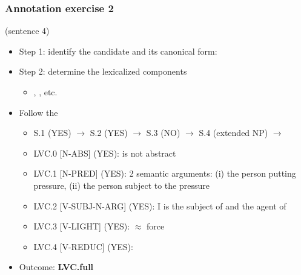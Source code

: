 \documentclass[xcolor=dvipsnames]{beamer}
\begin{document}
\begin{frame} 
\frametitle{Annotation exercise 2}

 (sentence 4)
\pause
\begin{scriptsize}
\begin{block}{}
\begin{itemize}
\item Step 1: identify the candidate and its canonical form: 
\item Step 2: determine the lexicalized components
   \begin{itemize}
   \item {}, , etc.
   \end{itemize}
\item Follow the \href{http://parsemefr.lif.univ-mrs.fr/parseme-st-guidelines/1.3/?page=040\_Annotation\_process\_-\_decision\_tree}{}
   \begin{itemize}
   \item S.1 (YES) $\rightarrow$ S.2 (YES) $\rightarrow$ S.3 (NO) $\rightarrow$ S.4 (extended NP) $\rightarrow$
   \item LVC.0 [N-ABS] (YES):  is not abstract
   \item LVC.1 [N-PRED] (YES): 2 semantic arguments: (i) the person putting pressure, (ii) the person subject to the pressure
   \item LVC.2 [V-SUBJ-N-ARG] (YES): I is the subject of  and the agent of  
   \item LVC.3 [V-LIGHT] (YES):  $\approx$ force
   \item LVC.4 [V-REDUC] (YES): 
   \end{itemize}
\item Outcome: \textbf{LVC.full}
\end{itemize}
\end{block}

\end{scriptsize}

\end{frame}
\end{document}
